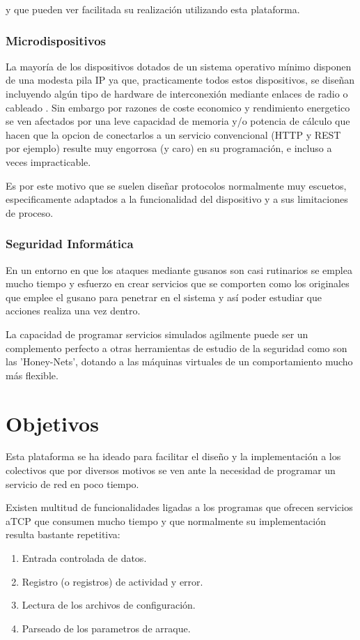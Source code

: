 \documentclass[a4paper,spanish,12pt]{book}
\begin{document}
y que pueden ver facilitada su realización utilizando esta plataforma.

\subsection{Microdispositivos}
La mayor\'ia de los dispositivos dotados de un sistema operativo m\'inimo disponen de una modesta pila IP ya que, practicamente todos estos dispositivos, se dise\~{n}an incluyendo algún tipo de hardware de interconexi\'on mediante enlaces de radio o cableado . Sin embargo por razones de coste economico y rendimiento energetico se ven afectados por una leve capacidad de memoria y/o potencia de c\'alculo que hacen que la opcion de conectarlos a un servicio convencional (HTTP y REST por ejemplo) resulte muy engorrosa (y caro) en su programaci\'on, e incluso a veces impracticable.

Es por este motivo que se suelen dise\~{n}ar protocolos normalmente muy escuetos, especificamente adaptados a la funcionalidad del dispositivo y a sus limitaciones de proceso.

\subsection{Seguridad Inform\'atica}
En un entorno en que los ataques mediante gusanos son casi rutinarios se emplea mucho tiempo y esfuerzo en crear servicios que se comporten como los originales que emplee el gusano para penetrar en el sistema y as\'i poder estudiar que acciones realiza una vez dentro.

La capacidad de programar servicios simulados agilmente puede ser un complemento perfecto a otras herramientas de estudio de la seguridad como son las 'Honey-Nets', dotando a las m\'aquinas virtuales de un comportamiento mucho m\'as flexible.


\chapter{Objetivos}

Esta plataforma se ha ideado para facilitar el diseño y la implementación a los colectivos que por diversos motivos se ven ante la necesidad de programar un servicio de red en poco tiempo. 

Existen multitud de funcionalidades ligadas a los programas que ofrecen servicios aTCP que consumen mucho tiempo y que normalmente su implementaci\'on resulta bastante repetitiva:
\begin{enumerate}
	\item Entrada controlada de datos.
	\item Registro (o registros) de actividad y error.
	\item Lectura de los archivos de configuraci\'on.
	\item Parseado de los parametros de arraque.
\end{enumerate}
\end{document}
